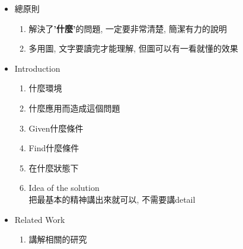 \begin{enumerate}
{\begin{itemize}
      \item
      {
        總原則
        \begin{enumerate}
          \item
          {
            解決了\textbf{'什麼'}的問題, 一定要非常清楚, 簡潔有力的說明
          } %

          \item
          {
            多用圖, 文字要讀完才能理解, 但圖可以有一看就懂的效果
          } %
        \end{enumerate}
      } %

      \item
      {
        Introduction
        \begin{enumerate}
          \item
          {
            什麼環境
          } %

          \item
          {
            什麼應用而造成這個問題
          } %

          \item
          {
            Given什麼條件
          } %

          \item
          {
            Find什麼條件
          } %

          \item
          {
            在什麼狀態下
          } %

          \item
          {
            Idea of the solution\\
            把最基本的精神講出來就可以, 不需要講detail
          } %
        \end{enumerate}
      } %

      \item
      {
        Related Work
        \begin{enumerate}
          \item
          {
            講解相關的研究
          } %


\end{enumerate}}
\end{itemize}}
\end{enumerate}
